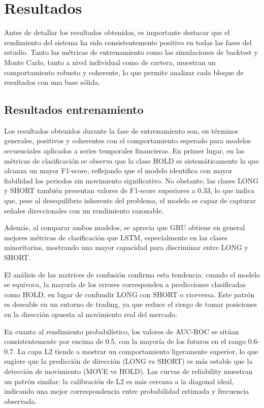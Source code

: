 \setlength{\parindent}{0em}

\chapter{Resultados}\label{cap4}\thispagestyle{fancy}

\vspace{-1.3cm}

Antes de detallar los resultados obtenidos, es importante destacar que el rendimiento del sistema ha sido consistentemente positivo en todas las fases
del estudio. Tanto las métricas de entrenamiento como las simulaciones de backtest y Monte Carlo, tanto a nivel individual como de cartera, muestran
un comportamiento robusto y coherente, lo que permite analizar cada bloque de resultados con una base sólida.

\section{Resultados entrenamiento}

Los resultados obtenidos durante la fase de entrenamiento son, en términos generales, positivos y coherentes con el comportamiento esperado para
modelos secuenciales aplicados a series temporales financieras. En primer lugar, en las métricas de clasificación se observa que la clase HOLD es
sistemáticamente la que alcanza un mayor F1-score, reflejando que el modelo identifica con mayor fiabilidad los periodos sin movimiento significativo.
No obstante, las clases LONG y SHORT también presentan valores de F1-score superiores a 0.33, lo que indica que, pese al desequilibrio inherente del
problema, el modelo es capaz de capturar señales direccionales con un rendimiento razonable.

Además, al comparar ambos modelos, se aprecia que GRU obtiene en general mejores métricas de clasificación que LSTM, especialmente en las clases
minoritarias, mostrando una mayor capacidad para discriminar entre LONG y SHORT.

El análisis de las matrices de confusión confirma esta tendencia: cuando el modelo se equivoca, la mayoría de los errores corresponden a predicciones
clasificadas como HOLD, en lugar de confundir LONG con SHORT o viceversa. Este patrón es deseable en un entorno de trading, ya que reduce el riesgo de
tomar posiciones en la dirección opuesta al movimiento real del mercado.

En cuanto al rendimiento probabilístico, los valores de AUC-ROC se sitúan consistentemente por encima de 0.5, con la mayoría de los futuros en el
rango 0.6-0.7. La capa L2 tiende a mostrar un comportamiento ligeramente superior, lo que sugiere que la predicción de dirección (LONG vs SHORT) es
más estable que la detección de movimiento (MOVE vs HOLD). Las curvas de reliability muestran un patrón similar: la calibración de L2 es más cercana a
la diagonal ideal, indicando una mejor correspondencia entre probabilidad estimada y frecuencia observada.

